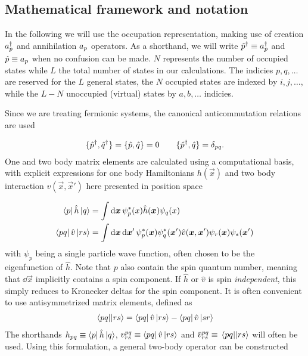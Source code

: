 \subsection{Mathematical framework and notation}
In the following we will use the occupation representation, making use of creation $a^{\dagger}_{p}$ and annihilation $a_{p}$ operators. As a shorthand, we will write $\hat{p}^{\dagger} \equiv a^{\dagger}_{p}$ and $\hat{p} \equiv a_{p}$ when no confusion can be made. $N$ represents the number of occupied states while $L$ the total number of states in our calculations. The indicies $p,q,\ldots$ are reserved for the $L$ general states, the $N$ occupied states are indexed by $i,j,\ldots$, while the $L-N$ unoccupied (virtual) states by $a,b,\ldots$ indicies.

Since we are treating fermionic systems, the canonical anticommutation relations are used

\begin{align*}
    \set{\crt{p},\crt{q}} = \set{\ani{p},\ani{q}} = 0 \hspace{20px} \set{\crt{p},\ani{q}} = \delta_{pq}.
\end{align*}
One and two body matrix elements are calculated using a computational basis, with explicit expressions for one body Hamiltonians $h(\vec{x})$ and two body interaction $v(\vec{x}, \vec{x}')$ here presented in position space

\begin{align*}
    \bra{p}\hat{h}\ket{q} &= \int \dd{\boldsymbol{x}} \psi_p^*(x) \hat{h}(\boldsymbol{x}) \psi_q(x) \\
    \bra{pq}\hat{v}\ket{rs} &= \int \dd{\boldsymbol{x}}\dd{\boldsymbol{x}'} \psi_p^*(\boldsymbol{x})\psi_q^*(\boldsymbol{x}') \hat{v}(\boldsymbol{x},\boldsymbol{x}') \psi_r(\boldsymbol{x})\psi_s(\boldsymbol{x}')
\end{align*}
with $\psi_p$ being a single particle wave function, often chosen to be the eigenfunction of $\hat{h}$. Note that $p$ also contain the spin quantum number, meaning that $\dd \vec{x}$ implicitly contains a spin component. If $\hat{h}$ or $\hat{v}$ is spin \textit{independent}, this simply reduces to Kronecker deltas for the spin component. It is often convenient to use antisymmetrized matrix elements, defined as 
\begin{align*}
    \mel{pq}{}{rs} = \bra{pq}\hat{v}\ket{rs} - \bra{pq}\hat{v}\ket{sr}
\end{align*}
The shorthands $h_{pq} \equiv \bra{p} \hat{h} \ket{q}$, $v^{pq}_{rs} \equiv \bra{pq}\hat{v}\ket{rs}$ and $\bar{v}^{pq}_{rs} \equiv \mel{pq}{}{rs}$ will often be used. Using this formulation, a general two-body operator can be constructed

